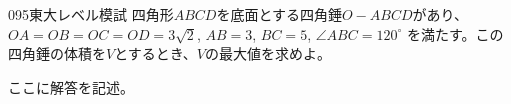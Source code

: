 \begin{prob}{095}{}{東大レベル模試}
 四角形$ABCD$を底面とする四角錘$O-ABCD$があり、$OA=OB=OC=OD=3\sqrt{2}$, $AB=3$, $BC=5$, $\angle{ABC}=120^\circ$ を満たす。この四角錘の体積を$V$とするとき、$V$の最大値を求めよ。
\end{prob}
ここに解答を記述。